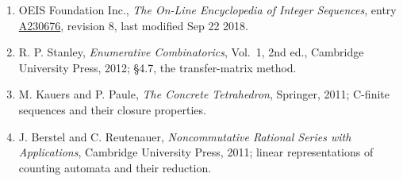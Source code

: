 \documentclass[11pt]{article}
\theoremstyle{definition}
\begin{document}
\begin{enumerate}

\item OEIS Foundation Inc., \emph{The On-Line Encyclopedia of Integer Sequences}, entry \href{https://oeis.org/A230676}{A230676}, revision 8, last modified Sep 22 2018.

\item R. P. Stanley, \emph{Enumerative Combinatorics}, Vol.~1, 2nd ed., Cambridge University Press, 2012; \S4.7, the transfer-matrix method.

\item M. Kauers and P. Paule, \emph{The Concrete Tetrahedron}, Springer, 2011; C-finite sequences and their closure properties.

\item J. Berstel and C. Reutenauer, \emph{Noncommutative Rational Series with Applications}, Cambridge University Press, 2011; linear representations of counting automata and their reduction.

\end{enumerate}
\end{document}

